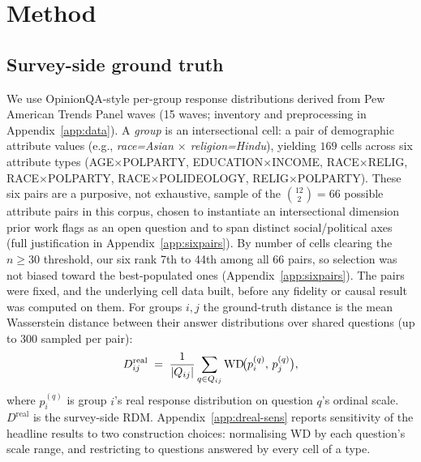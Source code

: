 \section{Method}
\label{sec:setup}

\subsection{Survey-side ground truth}
We use OpinionQA-style per-group response distributions derived from Pew
American Trends Panel waves \citep{opinionqa2023, subpop2025} (15 waves;
inventory and preprocessing in Appendix~\ref{app:data}). A \emph{group} is an intersectional cell: a pair
of demographic attribute values (e.g., \textit{race=Asian $\times$
religion=Hindu}), yielding $169$ cells across six attribute types
(AGE$\times$POLPARTY, EDUCATION$\times$INCOME, RACE$\times$RELIG,
RACE$\times$POLPARTY, RACE$\times$POLIDEOLOGY, RELIG$\times$POLPARTY).
These six pairs are a purposive, not exhaustive, sample of the
$\binom{12}{2}=66$ possible attribute pairs in this corpus, chosen to
instantiate an intersectional dimension prior work flags as an open
question and to span distinct social/political axes (full justification
in Appendix~\ref{app:sixpairs}). By number of cells clearing the
$n\geq30$ threshold, our six rank 7th to 44th among all 66 pairs, so
selection was not biased toward the best-populated ones
(Appendix~\ref{app:sixpairs}). The pairs were fixed, and the underlying cell
data built, before any fidelity or causal result was computed on them.
For groups $i,j$ the ground-truth distance is the mean Wasserstein
distance between their answer distributions over shared questions
(up to 300 sampled per pair):
\begin{equation}
D^{\mathrm{real}}_{ij} \;=\; \frac{1}{|Q_{ij}|}\sum_{q\in Q_{ij}}
\mathrm{WD}\!\big(p_i^{(q)},\, p_j^{(q)}\big),
\end{equation}
where $p_i^{(q)}$ is group $i$'s real response distribution on question
$q$'s ordinal scale. $D^{\mathrm{real}}$ is the survey-side RDM.
Appendix~\ref{app:dreal-sens} reports sensitivity of the headline results
to two construction choices: normalising WD by each question's scale
range, and restricting to questions answered by every cell of a type.

